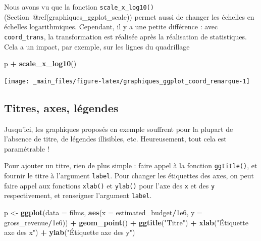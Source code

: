 \documentclass[
  11pt,
]{book}
\newenvironment{Shaded}{\begin{snugshade}}{\end{snugshade}}
\newcommand{\DataTypeTok}[1]{\textcolor[rgb]{0.13,0.29,0.53}{#1}}
\newcommand{\FloatTok}[1]{\textcolor[rgb]{0.00,0.00,0.81}{#1}}
\newcommand{\KeywordTok}[1]{\textcolor[rgb]{0.13,0.29,0.53}{\textbf{#1}}}
\newcommand{\NormalTok}[1]{#1}
\newcommand{\OperatorTok}[1]{\textcolor[rgb]{0.81,0.36,0.00}{\textbf{#1}}}
\newcommand{\StringTok}[1]{\textcolor[rgb]{0.31,0.60,0.02}{#1}}
\numberwithin{equation}{section}
\newcounter{countremarque}
\newenvironment{remarque}{%
 \refstepcounter{countremarque}
    \begin{tcolorbox}[width=\linewidth, colback=blue!3, boxrule=0.5pt,arc=0pt,title = Remarque \thecountremarque]
    }%
    {
    \end{tcolorbox}
    }
\numberwithin{countremarque}{section}
\begin{document}
\begin{remarque}
Nous avons vu que la fonction \texttt{scale\_x\_log10()} (Section~@ref(graphiques\_ggplot\_scale)) permet aussi de changer les échelles en échelles logarithmiques. Cependant, il y a une petite différence : avec \texttt{coord\_trans}, la transformation est réalisée après la réalisation de statistiques. Cela a un impact, par exemple, sur les lignes du quadrillage
\end{remarque}

\begin{Shaded}
\begin{Highlighting}[]
\NormalTok{p }\OperatorTok{+}\StringTok{ }\KeywordTok{scale\_x\_log10}\NormalTok{()}
\end{Highlighting}
\end{Shaded}

\begin{center}\texttt{[image: \_main\_files/figure-latex/graphiques\_ggplot\_coord\_remarque-1]} \end{center}

\hypertarget{graphiques_ggplot_axes}{%
\subsection{Titres, axes, légendes}\label{graphiques_ggplot_axes}}

Jusqu'ici, les graphiques proposés en exemple souffrent pour la plupart de l'absence de titre, de légendes illisibles, etc. Heureusement, tout cela est paramétrable !

Pour ajouter un titre, rien de plus simple : faire appel à la fonction \texttt{ggtitle()}, et fournir le titre à l'argument \texttt{label}. Pour changer les étiquettes des axes, on peut faire appel aux fonctions \texttt{xlab()} et \texttt{ylab()} pour l'axe des \texttt{x} et des \texttt{y} respectivement, et renseigner l'argument \texttt{label}.

\begin{Shaded}
\begin{Highlighting}[]
\NormalTok{p \textless{}{-}}\StringTok{ }\KeywordTok{ggplot}\NormalTok{(}\DataTypeTok{data =}\NormalTok{ films,}
            \KeywordTok{aes}\NormalTok{(}\DataTypeTok{x =}\NormalTok{ estimated\_budget}\OperatorTok{/}\FloatTok{1e6}\NormalTok{,}
                \DataTypeTok{y =}\NormalTok{ gross\_revenue}\OperatorTok{/}\FloatTok{1e6}\NormalTok{)) }\OperatorTok{+}
\StringTok{  }\KeywordTok{geom\_point}\NormalTok{() }\OperatorTok{+}
\StringTok{  }\KeywordTok{ggtitle}\NormalTok{(}\StringTok{"Titre"}\NormalTok{) }\OperatorTok{+}
\StringTok{  }\KeywordTok{xlab}\NormalTok{(}\StringTok{"Étiquette axe des x"}\NormalTok{) }\OperatorTok{+}
\StringTok{  }\KeywordTok{ylab}\NormalTok{(}\StringTok{"Étiquette axe des y"}\NormalTok{)}
\end{Highlighting}
\end{Shaded}
\end{document}
